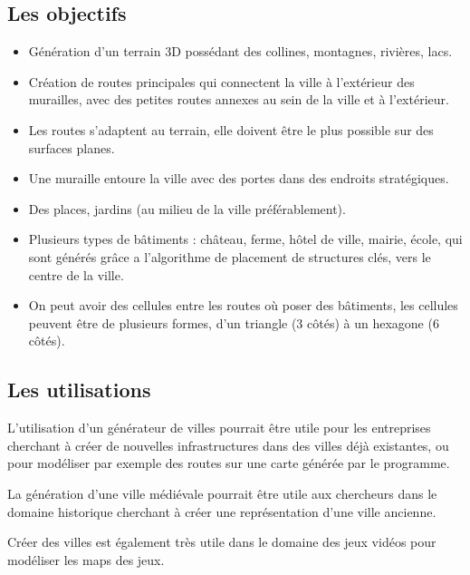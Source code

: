 \subsection{Les objectifs}
\begin{itemize}
    
  \item Génération d'un terrain 3D possédant des collines, montagnes, rivières, lacs.
  \item Création de routes principales qui connectent la ville à l'extérieur des murailles, avec des petites routes annexes au sein de la ville et à l'extérieur.
  \item Les routes s'adaptent au terrain, elle doivent être le plus possible sur des surfaces planes.
  \item Une muraille entoure la ville avec des portes dans des endroits stratégiques.
  \item Des places, jardins (au milieu de la ville préférablement).
  \item Plusieurs types de bâtiments : château, ferme, hôtel de ville, mairie, école, qui sont générés grâce a l'algorithme de placement de structures clés, vers le centre de la ville.
  \item On peut avoir des cellules entre les routes où poser des bâtiments, les cellules peuvent être de plusieurs formes, d'un triangle (3 côtés) à un hexagone (6 côtés).
\end{itemize}

\subsection{Les utilisations}

L’utilisation d’un générateur de villes pourrait être utile pour les entreprises cherchant à créer de nouvelles infrastructures dans des villes déjà existantes, ou pour modéliser par exemple des routes sur une carte générée par le programme.

La génération d'une ville médiévale pourrait être utile aux chercheurs dans le domaine historique cherchant à créer une représentation d'une ville ancienne.

Créer des villes est également très utile dans le domaine des jeux vidéos pour modéliser les maps des jeux.